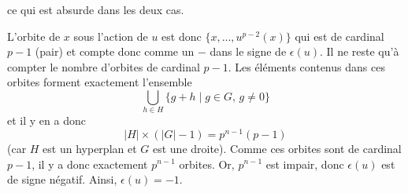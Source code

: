 \begin{demonstration}
\begin{itemize}
			ce qui est absurde dans les deux cas.
		\end{itemize}
		L'orbite de $x$ sous l'action de $u$ est donc $\{ x, \dots, u^{p-2}(x) \}$ qui est de cardinal $p-1$ (pair) et compte donc comme un $-$ dans le signe de $\epsilon(u)$.
		\newpar
		Il ne reste qu'à compter le nombre d'orbites de cardinal $p-1$. Les éléments contenus dans ces orbites forment exactement l'ensemble
		\[ \bigcup_{h \in H} \{ g + h \mid g \in G, \, g \neq 0 \} \]
		et il y en a donc
		\[ |H| \times (|G|-1) = p^{n-1}(p-1) \]
		(car $H$ est un hyperplan et $G$ est une droite). Comme ces orbites sont de cardinal $p-1$, il y a donc exactement $p^{n-1}$ orbites. Or, $p^{n-1}$ est impair, donc $\epsilon(u)$ est de signe négatif. Ainsi, $\epsilon(u) = -1$.
	\end{demonstration}
